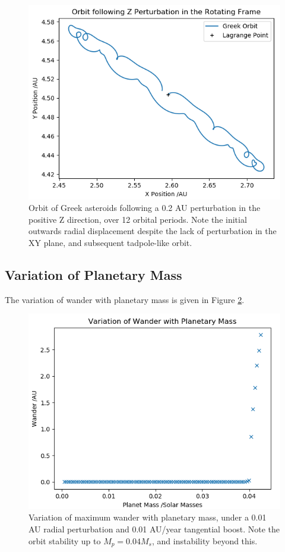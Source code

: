 \documentclass[11pt, a4paper,twocolumn]{article} %
\begin{document}
\begin{figure}
	\centering
	\includegraphics[width=0.8\linewidth]{Figures/z_perturb_orbit}
	\caption{Orbit of Greek asteroids following a 0.2 AU perturbation in the positive Z direction, over 12 orbital periods. Note the initial outwards radial displacement despite the lack of perturbation in the XY plane, and subsequent tadpole-like orbit.}
	\label{fig:zorbit}
\end{figure}

\subsection{Variation of Planetary Mass} \label{planet}
The variation of wander with planetary mass is given in Figure \ref{fig:planetmass}.

\begin{figure}
	\centering
	\includegraphics[width=0.8\linewidth]{Figures/wanderwithplanetmass_p6}
	\caption{Variation of maximum wander with planetary mass, under a 0.01 AU radial perturbation and 0.01 AU/year tangential boost. Note the orbit stability up to $ M_{p} = 0.04 M_{s}$, and instability beyond this.}
	\label{fig:planetmass}
\end{figure}
\end{document}
